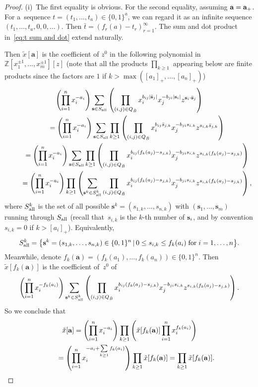 \documentclass[pdftex]{sigma}
\numberwithin{equation}{section}
\begin{document}
\begin{proof} (i)~The f\/irst equality is obvious. For the second equality, assuming ${\bf a}={\bf a}_+$.
For a~sequence $t=(t_1,\dots,t_a)\in\{0,1\}^a$, we can regard it as an inf\/inite sequence $(t_1,\dots,t_a,0,0,\dots)$. Then $\bar{t}=(f_r(a)-t_r)_{r=1}^\infty$. The sum and dot product in~\eqref{eq:t sum and dot} extend naturally.

Then
$\tilde{x}[\mathbf{a}]$ is the coef\/f\/icient of $z^0$ in the following polynomial in $\mathbb{Z}[x_1^{\pm 1},\ldots,x_m^{\pm 1}][z]$ (note that all the products $\prod\limits_{k\ge 1}$ appearing below are f\/inite products since the factors are $1$ if $k>\max([a_1]_+,\dots,[a_n]_+)$)
\begin{gather*}
\left(\prod_{i=1}^n  x_i^{-a_i}\right)
\sum_{\mathbf{s}\in S_{\rm all}}\left(\prod_{(i,j)\in Q_{\tilde B}}  x_{i}^{b_{ij}|\bar{\mathbf{s}}_j|} x_{j}^{-b_{ji}|\mathbf{s}_i|}z^{\mathbf{s}_i\cdot \bar{\mathbf{s}}_j}\right)\\
\qquad {} =\left(\prod_{i=1}^n  x_i^{-a_i}\right)
\sum_{\mathbf{s}\in S_{\rm all}}\prod_{k\ge1}\left(\prod_{(i,j)\in Q_{\tilde B}}  x_{i}^{b_{ij}\bar{s}_{j,k}} x_{j}^{-b_{ji}s_{i,k}}z^{s_{i,k}\bar{s}_{j,k}}\right)\\
\qquad {} =\left(\prod_{i=1}^n  x_i^{-a_i}\right)
\sum_{\mathbf{s}\in S_{\rm all}}\prod_{k\ge1}\left(\prod_{(i,j)\in Q_{\tilde B}}  x_{i}^{b_{ij}(f_k(a_j)-s_{j,k})} x_{j}^{-b_{ji}s_{i,k}}z^{s_{i,k}(f_k(a_j)-s_{j,k})}\right)\\
\qquad {} =\left(\prod_{i=1}^n  x_i^{-a_i}\right)\prod_{k\ge1}
\left(\sum_{\mathbf{s}^k\in S_{\rm all}^k}\prod_{(i,j)\in Q_{\tilde B}}  x_{i}^{b_{ij}(f_k(a_j)-s_{j,k})} x_{j}^{-b_{ji}s_{i,k}}z^{s_{i,k}(f_k(a_j)-s_{j,k})}\right),
\end{gather*}
where $S^k_{\rm all}$ is the set of all possible $\mathbf{s}^k=(s_{1,k},\dots,s_{n,k})$ with $(\mathbf{s}_1,\dots,\mathbf{s}_m)$ running through $S_{\rm all}$ (recall that~$s_{i,k}$ is the $k$-th number of ${\bf s}_i$, and by convention $s_{i,k}=0$ if $k>[a_i]_+$). Equivalently,
\begin{gather*}
S^k_{\rm all}=\big\{\mathbf{s}^k=(s_{1,k},\dots,s_{n,k})\in\{0,1\}^n\,|\,0\le s_{i,k}\le f_k(a_i) \; \textrm{for} \; i=1,\dots,n\big\}.
\end{gather*}
Meanwhile, denote $f_k(\mathbf{a})=(f_k(a_1),\dots,f_k(a_n))\in\{0,1\}^n$. Then $\tilde{x}[f_k(\mathbf{a})]$ is the coef\/f\/icient of~$z^0$ of
\begin{gather*}
\left(\prod_{i=1}^n  x_i^{-f_k(a_i)}\right)
\sum_{\mathbf{s}^k\in S_{\rm all}^k}\left(\prod_{(i,j)\in Q_{\tilde B}}  x_{i}^{b_{ij}(f_k(a_j)-s_{j,k})} x_{j}^{-b_{ji}s_{i,k}}z^{s_{i,k}(f_k(a_j)-s_{j,k})}\right).
\end{gather*}
So we conclude that
\begin{gather*}
\tilde{x}[\mathbf{a}]
 =\left(\prod_{i=1}^n x_i^{-a_i}\right)\prod_{k\ge1}\left(\tilde{x}[f_k(\mathbf{a})]\prod_{i=1}^n x_i^{f_k(a_i)}\right)\\
\hphantom{\tilde{x}[\mathbf{a}]}{} =\left(\prod_{i=1}^n x_i^{-a_i+\sum\limits_{k\ge1}f_k(a_i)}\right)\prod_{k\ge1}
\tilde{x}[f_k(\mathbf{a})]
=\prod_{k\ge1}
\tilde{x}[f_k(\mathbf{a})].
\end{gather*}



\end{proof}
\end{document}
